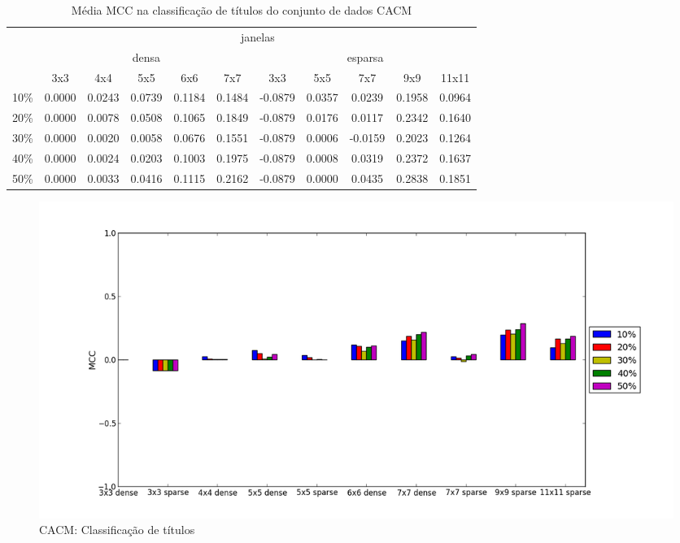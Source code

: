 \documentclass[a4paper,11pt]{article}
\begin{document}
  \begin{center}
    \begin{table}[p]
      \caption{Média MCC na classificação de títulos do conjunto de dados CACM}
      \begin{tabular}{ l | c c c c c || c c c c c | }
        \cline{2-11}
        & \multicolumn{10}{|c|}{janelas} \\
        \cline{2-11}
        & \multicolumn{5}{c||}{densa} & \multicolumn{5}{c|}{esparsa} \\
        \cline{2-11}
        & 3x3 & 4x4 & 5x5 & 6x6 & 7x7 & 3x3 & 5x5 & 7x7 & 9x9 & 11x11 \\
        \hline
        \multicolumn{1}{|l|}{10\%}& 0.0000& 0.0243& 0.0739& 0.1184& 0.1484& -0.0879& 0.0357& 0.0239& 0.1958& 0.0964\\
        \multicolumn{1}{|l|}{20\%}& 0.0000& 0.0078& 0.0508& 0.1065& 0.1849& -0.0879& 0.0176& 0.0117& 0.2342& 0.1640\\
        \multicolumn{1}{|l|}{30\%}& 0.0000& 0.0020& 0.0058& 0.0676& 0.1551& -0.0879& 0.0006& -0.0159& 0.2023& 0.1264\\
        \multicolumn{1}{|l|}{40\%}& 0.0000& 0.0024& 0.0203& 0.1003& 0.1975& -0.0879& 0.0008& 0.0319& 0.2372& 0.1637\\
        \multicolumn{1}{|l|}{50\%}& 0.0000& 0.0033& 0.0416& 0.1115& 0.2162& -0.0879& 0.0000& 0.0435& 0.2838& 0.1851\\
        \hline  
      \end{tabular}
      \label{tab:cacm_mcc_heading}
    \end{table}
  \end{center}

  \begin{figure}[p]
    \centerline{\includegraphics[width=1.2\textwidth]{assets/experiment_charts/cacm_TextRegion_heading_mcc.png}}
    \caption{CACM: Classificação de títulos}
    \label{fig:cacm_TextRegion_heading_mcc}
  \end{figure}
\end{document}
